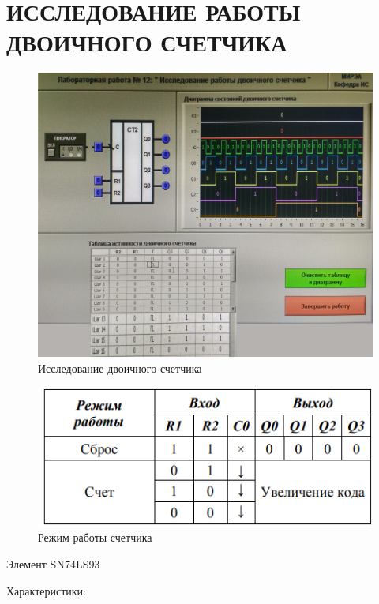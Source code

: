 \section{ИССЛЕДОВАНИЕ РАБОТЫ ДВОИЧНОГО СЧЕТЧИКА}



\begin{figure}[H]
	\centering
	\includegraphics[width=0.95\linewidth]{imgs/12/1.jpg}
	\caption{Исследование двоичного счетчика }
	\label{fig:12_1}
\end{figure}


\begin{figure}[H]
	\centering
	\includegraphics[width=0.85\linewidth]{imgs/12/12_tab}
	\caption{Режим работы счетчика}
	\label{fig:12_tab}
\end{figure}

Элемент SN74LS93 

Характеристики:



